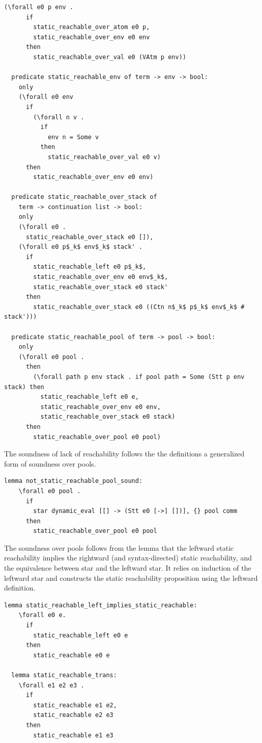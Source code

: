 \documentclass[10pt]{article}
\begin{document}
\begin{lstlisting}[language=logic, mathescape]
    (\forall e0 p env .
      if
        static_reachable_over_atom e0 p, 
        static_reachable_over_env e0 env
      then
        static_reachable_over_val e0 (VAtm p env))

  predicate static_reachable_env of term -> env -> bool:
    only
    (\forall e0 env
      if
        (\forall n v .
          if
            env n = Some v
          then
            static_reachable_over_val e0 v)
      then
        static_reachable_over_env e0 env)

  predicate static_reachable_over_stack of
    term -> continuation list -> bool:
    only
    (\forall e0 .
      static_reachable_over_stack e0 []),
    (\forall e0 p$_k$ env$_k$ stack' .
      if
        static_reachable_left e0 p$_k$, 
        static_reachable_over_env e0 env$_k$,
        static_reachable_over_stack e0 stack' 
      then
        static_reachable_over_stack e0 ((Ctn n$_k$ p$_k$ env$_k$ # stack')))

  predicate static_reachable_pool of term -> pool -> bool:
    only
    (\forall e0 pool .
      then
        (\forall path p env stack . if pool path = Some (Stt p env stack) then 
          static_reachable_left e0 e, 
          static_reachable_over_env e0 env, 
          static_reachable_over_stack e0 stack)
      then
        static_reachable_over_pool e0 pool)

  \end{lstlisting}

The soundness of lack of reachability follows the the definitions
a generalized form of soundness over pools.

\begin{lstlisting}[language=logic, mathescape]
  lemma not_static_reachable_pool_sound:
    \forall e0 pool .
      if
        star dynamic_eval [[] -> (Stt e0 [->] [])], {} pool comm 
      then
        static_reachable_over_pool e0 pool

  \end{lstlisting}


The soundness over pools follows from the lemma that the leftward
static reachability implies the rightward (and syntax-directed) static reachability,
and the equivalence between star and the leftward star.  It relies on induction of the
leftward star and constructs the static reachability
proposition using the leftward definition.  

\begin{lstlisting}[language=logic, mathescape]
  lemma static_reachable_left_implies_static_reachable:
    \forall e0 e. 
      if
        static_reachable_left e0 e
      then
        static_reachable e0 e

  lemma static_reachable_trans:
    \forall e1 e2 e3 .
      if 
        static_reachable e1 e2,
        static_reachable e2 e3
      then
        static_reachable e1 e3
  \end{lstlisting}
\end{document}
